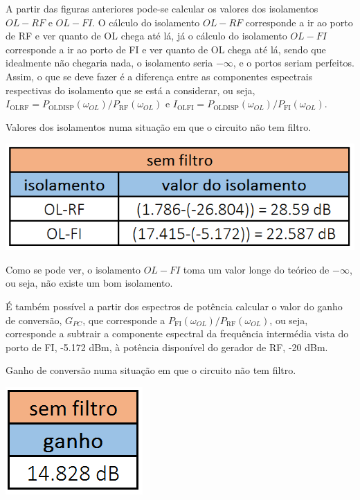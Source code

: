 \documentclass[11pt]{article}
\numberwithin{equation}{section}
\begin{document}
A partir das figuras anteriores pode-se calcular os valores dos isolamentos $OL - RF$ e $OL - FI$. O cálculo do isolamento $OL-RF$ corresponde a ir ao porto de RF e ver quanto de OL chega até lá, já o cálculo do isolamento $OL-FI$ corresponde a ir ao porto de FI e ver quanto de OL chega até lá, sendo que idealmente não chegaria nada, o isolamento seria $- \infty$, e o portos seriam perfeitos. Assim, o que se deve fazer é a diferença entre as componentes espectrais respectivas do isolamento que se está a considerar, ou seja, $I_{\text{OLRF}} = P_{\text{OLDISP}}\left(\omega_{OL}\right) / P_{\text{RF}}\left(\omega_{OL}\right) $ e $I_{\text{OLFI}} = P_{\text{OLDISP}}\left(\omega_{OL}\right) / P_{\text{FI}}\left(\omega_{OL}\right) $.

\begin{table}[h]
	\centering
	\caption{Valores dos isolamentos numa situação em que o circuito não tem filtro.}
	\vspace{-1.5mm}
	\includegraphics[keepaspectratio=true, scale=0.40]{teoricas/isolamentosSemFiltro}
\end{table}

Como se pode ver, o isolamento $OL - FI$ toma um valor longe do teórico de $- \infty$, ou seja, não existe um bom isolamento.

É também possível a partir dos espectros de potência calcular o valor do ganho de conversão, $G_{PC}$, que corresponde a $ P_{\text{FI}}\left(\omega_{OL}\right)/P_{\text{RF}}\left(\omega_{OL}\right) $, ou seja, corresponde a subtrair a componente espectral da frequência intermédia vista do porto de FI, -5.172 dBm, à potência disponível do gerador de RF, -20 dBm.

\begin{table}[h]
	\centering
	\caption{Ganho de conversão numa situação em que o circuito não tem filtro.}
	\vspace{-1.5mm}
	\includegraphics[keepaspectratio=true, scale=0.40]{teoricas/ganhoSemFiltro}
\end{table}
\end{document}
